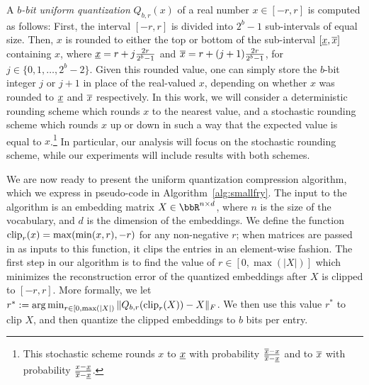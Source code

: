 
A \textit{$b$-bit uniform quantization} $Q_{b,r}(x)$ of a real number $x \in [-r,r]$ is computed as follows:
First, the interval $[-r,r]$ is divided into $2^b - 1$ sub-intervals of equal size.
Then, $x$ is rounded to either the top or bottom of the sub-interval $[\ulx,\olx]$ containing $x$, where $\ulx = r + j\frac{2r}{2^b-1}$ and $\olx = r + (j+1)\frac{2r}{2^b-1}$, for $j\in\{0,1,\ldots,2^b-2\}$.
Given this rounded value, one can simply store the $b$-bit integer $j$ or $j+1$ in place of the real-valued $x$, depending on whether $x$ was rounded to $\ulx$ and $\olx$ respectively.
In this work, we will consider a deterministic rounding scheme which rounds $x$ to the nearest value, and a stochastic rounding scheme which rounds $x$ up or down in such a way that the expected value is equal to $x$.\footnote{
	This stochastic scheme rounds $x$ to $\ulx$ with probability $\frac{\olx-x}{\olx-\ulx}$ and to $\olx$ with probability $\frac{x-\ulx}{\olx-\ulx}$.
}
In particular, our analysis will focus on the stochastic rounding scheme, while our experiments will include results with both schemes.


We are now ready to present the uniform quantization compression algorithm, which we express in pseudo-code in Algorithm~\ref{alg:smallfry}.
The input to the algorithm is an embedding matrix $X \in \RR^{n\times d}$, where $n$ is the size of the vocabulary, and $d$ is the dimension of the embeddings.
We define the function $\clip_r(x) = \max(\min(x,r),-r)$ for any non-negative $r$; when matrices are passed in as inputs to this function, it clips the entries in an element-wise fashion.
The first step in our algorithm is to find the value of $r \in [0,\max(|X|)]$ which minimizes the reconstruction error of the quantized embeddings after $X$ is clipped to $[-r,r]$.
More formally, we let $r^* \defeq \argmin_{r \in [0,\max(|X|)} \|Q_{b,r}(\clip_r(X))-X\|_F$.
We then use this value $r^*$ to clip $X$, and then quantize the clipped embeddings to $b$ bits per entry.

